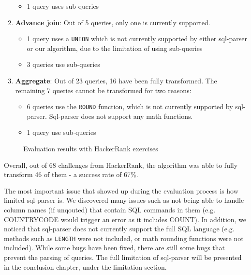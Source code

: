 \begin{enumerate}
\begin{itemize}
        \item 1 query uses sub-queries
    \end{itemize}
    \item \textbf{Advance join}: Out of 5 queries, only one is currently supported.
    \begin{itemize}
        \item 1 query uses a \texttt{UNION} which is not currently supported by either sql-parser or our algorithm, due to the limitation of using sub-queries
        \item 3 queries use sub-queries
    \end{itemize}
    \item \textbf{Aggregate}: Out of 23 queries, 16 have been fully transformed. The remaining 7 queries cannot be transformed for two reasons:
    \begin{itemize}
        \item 6 queries use the \texttt{ROUND} function, which is not currently supported by sql-parser. Sql-parser does not support any math functions.
        \item 1 query use sub-queries
    \end{itemize}
\end{enumerate}

\begin{figure}
\centering
{}
\caption{Evaluation results with HackerRank exercises}
\label{fig:my_label}
\end{figure}

Overall, out of 68 challenges from HackerRank, the algorithm was able to fully transform 46 of them - a success rate of 67\%. 

The most important issue that showed up during the evaluation process is how limited sql-parser is. We discovered many issues such as not being able to handle column names (if unqouted) that contain SQL commands in them (e.g. COUNTRYCODE would trigger an error as it includes COUNT). In addition, we noticed that sql-parser does not currently support the full SQL language (e.g. methods such as \texttt{LENGTH} were not included, or math rounding functions were not included). While some bugs have been fixed, there are still some bugs that prevent the parsing of queries. The full limitation of sql-parser will be presented in the conclusion chapter, under the limitation section.

